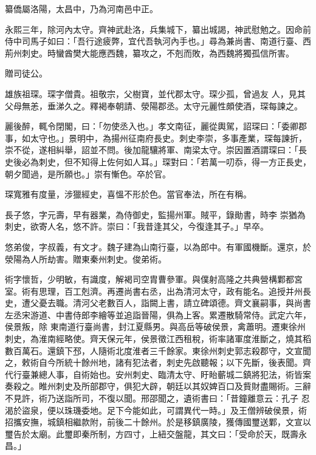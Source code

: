 \begin{pinyinscope}
 纂僑屬洛陽，太昌中，乃為河南邑中正。



 永熙三年，除河內太守。齊神武赴洛，兵集城下，纂出城謁，神武慰勉之。因命前侍中司馬子如曰：「吾行途疲弊，宜代吾執河內手也。」尋為兼尚書、南道行臺、西荊州刺史。時蠻酋樊大能應西魏，纂攻之，不剋而敗，為西魏將獨孤信所害。



 贈司徒公。



 雄族祖琛。琛字僧貴。祖敬宗，父樹寶，並代郡太守。琛少孤，曾過友
 人，見其父母無恙，垂涕久之。釋褐奉朝請、滎陽郡丞。太守元麗性頗使酒，琛每諫之。



 麗後醉，輒令閉閣，曰：「勿使丞入也。」孝文南征，麗從輿駕，詔琛曰：「委卿郡事，如太守也。」景明中，為揚州征南府長史。刺史李崇，多事產業，琛每諫折，崇不從，遂相糾舉，詔並不問。後加龍驤將軍、南梁太守。崇因置酒謂琛曰：「長史後必為刺史，但不知得上佐何如人耳。」琛對曰：「若萬一叨忝，得一方正長史，朝夕聞過，是所願也。」崇有慚色。卒於官。



 琛寬雅有度量，涉獵經史，喜慍不形於色。當官奉法，所在有稱。



 長子悠，字元壽，早有器業，為侍御史，監揚州軍。賊平，錄勛書，時李
 崇猶為刺史，欲寄人名，悠不許。崇曰：「我昔逢其父，今復逢其子。」早卒。



 悠弟俊，字叔義，有文才。魏子建為山南行臺，以為郎中。有軍國機斷。還京，於滎陽為人所劫害。贈東秦州刺史。俊弟術。



 術字懷哲，少明敏，有識度，解褐司空胄曹參軍。與僕射高隆之共典營構鄴都宮室。術有思理，百工剋濟。再遷尚書右丞，出為清河太守，政有能名。追授并州長史，遭父憂去職。清河父老數百人，詣闕上書，請立碑頌德。齊文襄嗣事，與尚書左丞宋游道、中書侍郎李繪等並追詣晉陽，俱為上客。累遷散騎常侍。武定六年，侯景叛，除
 東南道行臺尚書，封江夏縣男。與高岳等破侯景，禽蕭明。遷東徐州刺史，為淮南經略使。齊天保元年，侯景徵江西租稅，術率諸軍度淮斷之，燒其稻數百萬石。還鎮下邳，人隨術北度淮者三千餘家。東徐州刺史郭志殺郡守，文宣聞之，敕術自今所統十餘州地，諸有犯法者，刺史先啟聽報；以下先斷，後表聞。齊代行臺兼總人事，自術始也。安州刺史、臨清太守、盱眙蘄城二鎮將犯法，術皆案奏殺之。睢州刺史及所部郡守，俱犯大辟，朝廷以其奴婢百口及貲財盡賜術。三辭不見許，術乃送詣所司，不復以聞。邢邵聞之，遺術書曰：「昔鐘離意云：孔子
 忍渴於盜泉，便以珠璣委地。足下今能如此，可謂異代一時。」及王僧辨破侯景，術招攜安撫，城鎮相繼款附，前後二十餘州。於是移鎮廣陵，獲傳國璽送鄴，文宣以璽告於太廟。此璽即秦所制，方四寸，上紐交盤龍，其文曰：「受命於天，既壽永昌。」




\end{pinyinscope}
